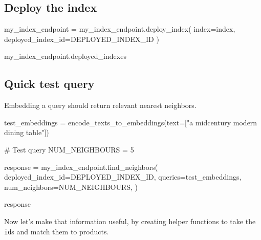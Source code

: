 \documentclass[
  letterpaper,
  DIV=11,
  numbers=noendperiod]{scrreprt}
\newenvironment{Shaded}{\begin{snugshade}}{\end{snugshade}}
\newcommand{\CommentTok}[1]{\textcolor[rgb]{0.37,0.37,0.37}{#1}}
\newcommand{\DecValTok}[1]{\textcolor[rgb]{0.68,0.00,0.00}{#1}}
\newcommand{\NormalTok}[1]{\textcolor[rgb]{0.00,0.23,0.31}{#1}}
\newcommand{\OperatorTok}[1]{\textcolor[rgb]{0.37,0.37,0.37}{#1}}
\newcommand{\StringTok}[1]{\textcolor[rgb]{0.13,0.47,0.30}{#1}}
\begin{document}
\hypertarget{deploy-the-index-1}{%
\subsection{Deploy the index}\label{deploy-the-index-1}}

\begin{Shaded}
\begin{Highlighting}[]
\NormalTok{my\_index\_endpoint }\OperatorTok{=}\NormalTok{ my\_index\_endpoint.deploy\_index(}
\NormalTok{    index}\OperatorTok{=}\NormalTok{index, deployed\_index\_id}\OperatorTok{=}\NormalTok{DEPLOYED\_INDEX\_ID}
\NormalTok{)}

\NormalTok{my\_index\_endpoint.deployed\_indexes}
\end{Highlighting}
\end{Shaded}

\hypertarget{quick-test-query}{%
\subsection{Quick test query}\label{quick-test-query}}

Embedding a query should return relevant nearest neighbors.

\begin{Shaded}
\begin{Highlighting}[]
\NormalTok{test\_embeddings }\OperatorTok{=}\NormalTok{ encode\_texts\_to\_embeddings(text}\OperatorTok{=}\NormalTok{[}\StringTok{"a midcentury modern dining table"}\NormalTok{])}
\end{Highlighting}
\end{Shaded}

\begin{Shaded}
\begin{Highlighting}[]
\CommentTok{\# Test query}
\NormalTok{NUM\_NEIGHBOURS }\OperatorTok{=} \DecValTok{5}

\NormalTok{response }\OperatorTok{=}\NormalTok{ my\_index\_endpoint.find\_neighbors(}
\NormalTok{    deployed\_index\_id}\OperatorTok{=}\NormalTok{DEPLOYED\_INDEX\_ID,}
\NormalTok{    queries}\OperatorTok{=}\NormalTok{test\_embeddings,}
\NormalTok{    num\_neighbors}\OperatorTok{=}\NormalTok{NUM\_NEIGHBOURS,}
\NormalTok{)}

\NormalTok{response}
\end{Highlighting}
\end{Shaded}

Now let's make that information useful, by creating helper functions to
take the \texttt{id}s and match them to products.
\end{document}
